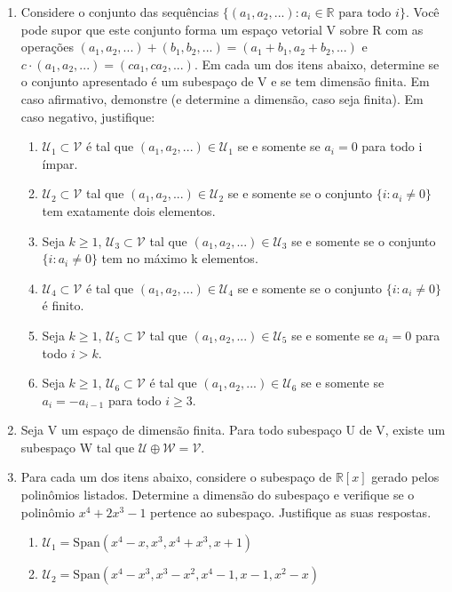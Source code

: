 \documentclass[12pt]{article}
\begin{document}
\begin{enumerate}
    \item Considere o conjunto das sequências $\{(a_{1},a_{2},...): a_{i} \in \mathbb{R} \text{ para todo } i\}$. Você pode supor que este conjunto forma um espaço vetorial V sobre R com as operações $(a_{1},a_{2},...)+(b_{1},b_{2},...)=(a_{1}+b_{1},a_{2}+b_{2},...)$ e $c\cdot(a_{1},a_{2},...)=(ca_{1},ca_{2},...)$. Em cada um dos itens abaixo, determine se o conjunto apresentado é um subespaço de V e se tem dimensão finita. Em caso afirmativo, demonstre (e determine a dimensão, caso seja finita). Em caso negativo, justifique:
    \begin{enumerate}
        \item $\mathcal{U}_{1} \subset \mathcal{V}$ é tal que $(a_{1},a_{2},...) \in \mathcal{U}_{1}$ se e somente se $a_{i}=0$ para todo i ímpar.
        \item $\mathcal{U}_{2} \subset \mathcal{V}$ tal que $(a_{1},a_{2},...) \in \mathcal{U}_{2}$ se e somente se o conjunto $\{i:a_{i} \ne 0\}$ tem exatamente dois elementos.
        \item Seja $k \ge 1$, $\mathcal{U}_{3} \subset \mathcal{V}$ tal que $(a_{1},a_{2},...) \in \mathcal{U}_{3}$ se e somente se o conjunto $\{i:a_{i} \ne 0\}$ tem no máximo k elementos.
        \item $\mathcal{U}_{4} \subset \mathcal{V}$ é tal que $(a_{1},a_{2},...) \in \mathcal{U}_{4}$ se e somente se o conjunto $\{i:a_{i} \ne 0\}$ é finito.
        \item Seja $k \ge 1$, $\mathcal{U}_{5} \subset \mathcal{V}$ tal que $(a_{1},a_{2},...) \in \mathcal{U}_{5}$ se e somente se $a_{i}=0$ para todo $i>k$.
        \item Seja $k \ge 1$, $\mathcal{U}_{6} \subset \mathcal{V}$ é tal que $(a_{1},a_{2},...) \in \mathcal{U}_{6}$ se e somente se $a_{i}=-a_{i-1}$ para todo $i \ge 3$.
    \end{enumerate}

    \item Seja V um espaço de dimensão finita. Para todo subespaço U de V, existe um subespaço W tal que $\mathcal{U} \oplus \mathcal{W} = \mathcal{V}$.

    \item Para cada um dos itens abaixo, considere o subespaço de $\mathbb{R}[x]$ gerado pelos polinômios listados. Determine a dimensão do subespaço e verifique se o polinômio $x^{4}+2x^{3}-1$ pertence ao subespaço. Justifique as suas respostas.
    \begin{enumerate}
        \item $\mathcal{U}_{1} = \text{Span}(x^{4}-x, x^{3}, x^{4}+x^{3}, x+1)$
        \item $\mathcal{U}_{2} = \text{Span}(x^{4}-x^{3}, x^{3}-x^{2}, x^{4}-1, x-1, x^{2}-x)$
    \end{enumerate}


\end{enumerate}
\end{document}
